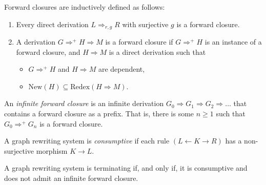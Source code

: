 \begin{definition}
    Forward closures are inductively defined as follows:
    \begin{enumerate}
        \item Every direct derivation $L \mathop{\Rightarrow}_{r,g} R$ with surjective $g$ is a forward closure.
        \item A derivation $G \mathop{\Rightarrow}^+ H \mathop{\Rightarrow} M$ is a forward closure if $G \mathop{\Rightarrow}^+ H$ is an instance of a forward closure, and $H \mathop{\Rightarrow} M$ is a direct derivation such that
        \begin{itemize}
            \item $G \mathop{\Rightarrow}^+ H$ and $H \mathop{\Rightarrow} M$ are dependent,
            \item $\text{New}(H) \mathop{\subseteq} \text{Redex}(H \mathop{\Rightarrow} M)$.
        \end{itemize}
    \end{enumerate}
\end{definition}

\begin{definition}
    An \textit{infinite forward closure} is an infinite derivation $G_0 \mathop{\Rightarrow} G_1 \mathop{\Rightarrow} G_2 \mathop{\Rightarrow} \dots$ that contains a forward closure as a prefix. That is, there is some $n \mathop{\geq} 1$ such that $G_0 \mathop{\Rightarrow}^+ G_n$ is a forward closure.
\end{definition}

\begin{definition}
    A graph rewriting system is \textit{consumptive} if each rule $(L \mathop{\leftarrow} K \mathop{\rightarrow} R)$ has a non-surjective morphism $K \mathop{\to} L$.
\end{definition}
    
\begin{theorem}
    A graph rewriting system is terminating if, and only if, it is consumptive and does not admit an infinite forward closure.
\end{theorem}